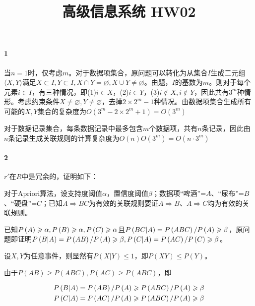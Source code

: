 \documentclass{../notes}
\title{高级信息系统 HW02}
\begin{document}
    \maketitle

    \paragraph*{1}

    当$n=1$时，仅考虑$m$。对于数据项集合，原问题可以转化为从集合$I$生成二元组$\langle X, Y\rangle$满足$X\subset I, Y\subset I, X\cap Y=\varnothing, X\cup Y\not =\varnothing$。由题，$I$的基数为$m$。则对于每个元素$i\in I$，有三种情况，即(1)$i\in X$，(2)$i\in Y$，(3)$i\not \in X, i\not \in Y$，因此共有$3^m$种情形。考虑约束条件$X\not = \varnothing, Y\not = \varnothing$，去掉$2\times 2^{m} - 1$种情况。由数据项集合生成所有可能的$X, Y$集合的复杂度为$O(3^{m} - 2\times 2^{m} + 1) = O(3^m)$

    对于数据记录集合，每条数据记录中最多包含$m$个数据项，共有$n$条记录，因此由$n$条记录生成关联规则的计算复杂度为$O(n)O(3^m) = O(n\cdot 3^m)$

    \separate

    \paragraph*{2} 

    $r'$在$R$中是冗余的，证明如下：

    对于Apriori算法，设支持度阈值$\alpha$，置信度阈值$\beta$；数据项“啤酒”=$A$、“尿布”=$B$、“硬盘”=$C$；已知$A\Rightarrow BC$为有效的关联规则要证$A\Rightarrow B$、$A\Rightarrow C$均为有效的关联规则。
    
    已知$P\left(A\right)\geqslant \alpha, P\left(B\right)\geqslant \alpha, P\left(C\right)\geqslant \alpha$且$P\left(BC|A\right) = P\left(ABC\right)/P\left(A\right)\geqslant \beta$，原问题即证明$P\left(B|A\right) = P\left(AB\right)/P\left(A\right)\geqslant \beta, P\left(C|A\right) = P\left(AC\right)/P\left(C\right)\geqslant \beta$。
    
    设$X, Y$为任意事件，则显然有$P(X|Y)\leq 1$，即$P(XY)\leq P(Y)$。
    
    由于$P(AB)\geq P(ABC), P(AC)\geq P(ABC)$，即

    \begin{equation}
        \begin{aligned}
            P\left(B|A\right) &= P\left(AB\right)/P\left(A\right)\geqslant P\left(ABC\right)/P\left(A\right) \geqslant \beta \\
            P\left(C|A\right) &= P\left(AC\right)/P\left(A\right)\geqslant P\left(ABC\right)/P\left(A\right) \geqslant\beta
        \end{aligned}
    \end{equation}
    
\end{document}
